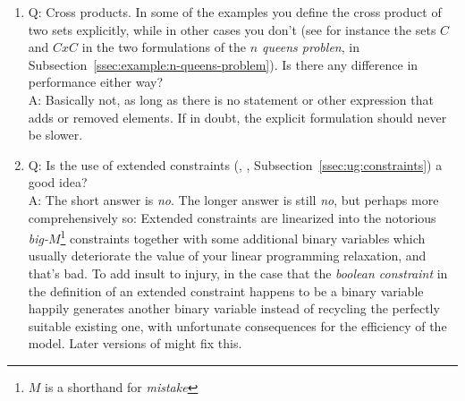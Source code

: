 \begin{enumerate}
\item Q: Cross products. In some of the examples you define the cross
  product of two sets explicitly, while in other cases you don't (see
  for instance the sets $C$ and $CxC$ in the two formulations of the
  \emph{$n$ queens problen}, in
  Subsection~\ref{ssec:example:n-queens-problem}). Is there any
  difference in performance either way?\\
  A: Basically not, as long as there is no  statement or
  other expression that adds or removed elements.
  If in doubt, the explicit formulation should never be slower.
  
\item Q: Is the use of extended constraints (, ,
  Subsection~\ref{ssec:ug:constraints}) a good idea?  \\
  A: The short answer is \emph{no}. The longer answer is still
  \emph{no}, but perhaps more comprehensively so: Extended constraints
  are linearized into the notorious \emph{big-$M$}\footnote{$M$ is a 
    shorthand for \emph{mistake}} constraints together with some
  additional binary variables which usually deteriorate the value of
  your linear programming relaxation, and that's bad. To add insult to
  injury, in the case that the \emph{boolean constraint} in the
  definition of an extended constraint happens to be a binary variable
  \zimpl happily generates another binary variable instead of
  recycling the perfectly suitable existing one, with unfortunate
  consequences for the efficiency of the model. Later versions of
  \zimpl might fix this.
\end{enumerate}
